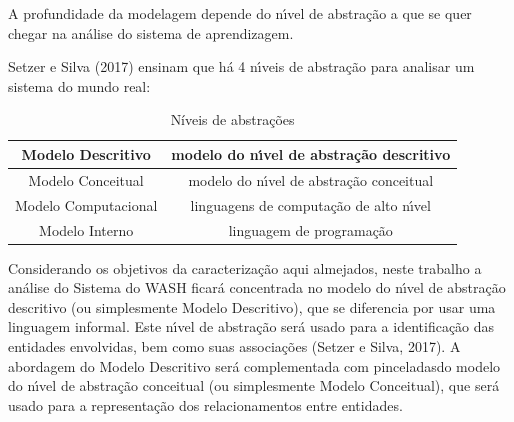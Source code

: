 \documentclass[
12pt,		%
openright,	%
twoside,  %
a4paper,			%
chapter=TITLE,		%
english,			%
french,				%
spanish,			%
brazil				%
]{USPSC-classe/USPSC}
\begin{document}
A profundidade da modelagem depende do n\'{\i}vel de abstra\c{c}\~ao a que se quer chegar na an\'alise do sistema de aprendizagem.














Setzer e Silva (2017) ensinam que h\'a 4 n\'{\i}veis de abstra\c{c}\~ao para analisar um sistema do mundo real:


















\begin{table}[htb]
\tiny
\caption{\label{ddb7374a787411a3bee0d5d790c47d75ffd71927}N\'{i}veis de abstra\c{c}\~oes}

\centering
\begin{tabular}{|c|c|}
\hline
Modelo Descritivo  &  modelo do n\'{\i}vel de abstra\c{c}\~ao descritivo \\
\hline
Modelo Conceitual  &  modelo do n\'{\i}vel de abstra\c{c}\~ao conceitual \\
\hline
Modelo Computacional  &  linguagens de computa\c{c}\~ao de alto n\'{\i}vel \\
\hline
Modelo Interno  &  linguagem de programa\c{c}\~ao \\
\hline
\end{tabular}
\end{table}


Considerando os objetivos da caracteriza\c{c}\~ao aqui almejados, neste trabalho a an\'alise do Sistema do WASH ficar\'a concentrada no modelo do n\'{\i}vel de abstra\c{c}\~ao descritivo (ou simplesmente Modelo Descritivo), que se diferencia por usar uma linguagem informal. Este n\'{\i}vel de abstra\c{c}\~ao ser\'a usado para a identifica\c{c}\~ao das entidades envolvidas, bem como suas associa\c{c}\~oes  (Setzer e Silva, 2017). A abordagem do Modelo Descritivo ser\'a complementada com \textquotedbl pinceladas\textquotedbl  do modelo do n\'{\i}vel de abstra\c{c}\~ao conceitual (ou simplesmente Modelo Conceitual), que ser\'a usado para a representa\c{c}\~ao dos relacionamentos entre entidades.
\end{document}
